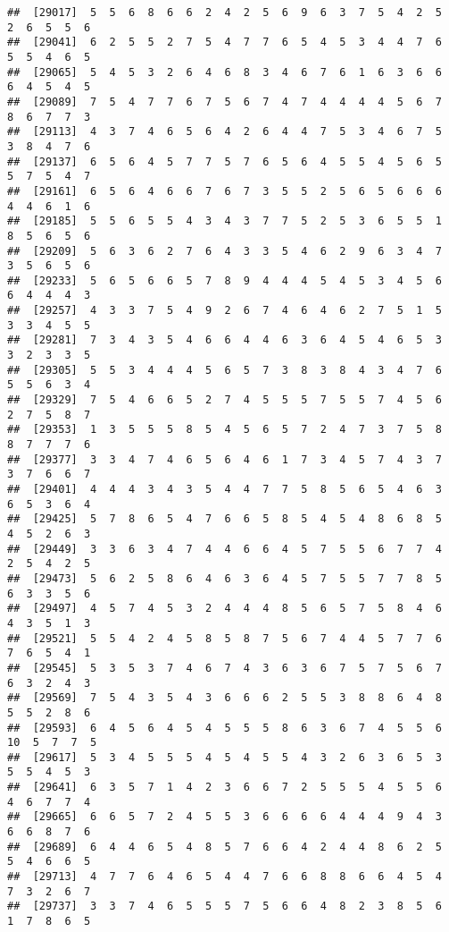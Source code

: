 \documentclass[
]{book}
\begin{document}
\begin{verbatim}
##  [29017]  5  5  6  8  6  6  2  4  2  5  6  9  6  3  7  5  4  2  5  2  6  5  5  6
##  [29041]  6  2  5  5  2  7  5  4  7  7  6  5  4  5  3  4  4  7  6  5  5  4  6  5
##  [29065]  5  4  5  3  2  6  4  6  8  3  4  6  7  6  1  6  3  6  6  6  4  5  4  5
##  [29089]  7  5  4  7  7  6  7  5  6  7  4  7  4  4  4  4  5  6  7  8  6  7  7  3
##  [29113]  4  3  7  4  6  5  6  4  2  6  4  4  7  5  3  4  6  7  5  3  8  4  7  6
##  [29137]  6  5  6  4  5  7  7  5  7  6  5  6  4  5  5  4  5  6  5  5  7  5  4  7
##  [29161]  6  5  6  4  6  6  7  6  7  3  5  5  2  5  6  5  6  6  6  4  4  6  1  6
##  [29185]  5  5  6  5  5  4  3  4  3  7  7  5  2  5  3  6  5  5  1  8  5  6  5  6
##  [29209]  5  6  3  6  2  7  6  4  3  3  5  4  6  2  9  6  3  4  7  3  5  6  5  6
##  [29233]  5  6  5  6  6  5  7  8  9  4  4  4  5  4  5  3  4  5  6  6  4  4  4  3
##  [29257]  4  3  3  7  5  4  9  2  6  7  4  6  4  6  2  7  5  1  5  3  3  4  5  5
##  [29281]  7  3  4  3  5  4  6  6  4  4  6  3  6  4  5  4  6  5  3  3  2  3  3  5
##  [29305]  5  5  3  4  4  4  5  6  5  7  3  8  3  8  4  3  4  7  6  5  5  6  3  4
##  [29329]  7  5  4  6  6  5  2  7  4  5  5  5  7  5  5  7  4  5  6  2  7  5  8  7
##  [29353]  1  3  5  5  5  8  5  4  5  6  5  7  2  4  7  3  7  5  8  8  7  7  7  6
##  [29377]  3  3  4  7  4  6  5  6  4  6  1  7  3  4  5  7  4  3  7  3  7  6  6  7
##  [29401]  4  4  4  3  4  3  5  4  4  7  7  5  8  5  6  5  4  6  3  6  5  3  6  4
##  [29425]  5  7  8  6  5  4  7  6  6  5  8  5  4  5  4  8  6  8  5  4  5  2  6  3
##  [29449]  3  3  6  3  4  7  4  4  6  6  4  5  7  5  5  6  7  7  4  2  5  4  2  5
##  [29473]  5  6  2  5  8  6  4  6  3  6  4  5  7  5  5  7  7  8  5  6  3  3  5  6
##  [29497]  4  5  7  4  5  3  2  4  4  4  8  5  6  5  7  5  8  4  6  4  3  5  1  3
##  [29521]  5  5  4  2  4  5  8  5  8  7  5  6  7  4  4  5  7  7  6  7  6  5  4  1
##  [29545]  5  3  5  3  7  4  6  7  4  3  6  3  6  7  5  7  5  6  7  6  3  2  4  3
##  [29569]  7  5  4  3  5  4  3  6  6  6  2  5  5  3  8  8  6  4  8  5  5  2  8  6
##  [29593]  6  4  5  6  4  5  4  5  5  5  8  6  3  6  7  4  5  5  6 10  5  7  7  5
##  [29617]  5  3  4  5  5  5  4  5  4  5  5  4  3  2  6  3  6  5  3  5  5  4  5  3
##  [29641]  6  3  5  7  1  4  2  3  6  6  7  2  5  5  5  4  5  5  6  4  6  7  7  4
##  [29665]  6  6  5  7  2  4  5  5  3  6  6  6  6  4  4  4  9  4  3  6  6  8  7  6
##  [29689]  6  4  4  6  5  4  8  5  7  6  6  4  2  4  4  8  6  2  5  5  4  6  6  5
##  [29713]  4  7  7  6  4  6  5  4  4  7  6  6  8  8  6  6  4  5  4  7  3  2  6  7
##  [29737]  3  3  7  4  6  5  5  5  7  5  6  6  4  8  2  3  8  5  6  1  7  8  6  5

\end{verbatim}
\end{document}
